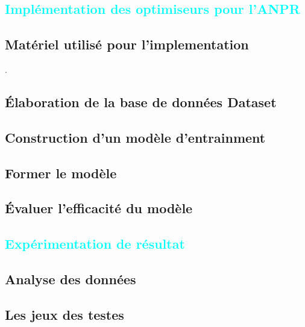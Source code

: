 
%
%

\textcolor{cyan}{\chapter{Implémentation des optimiseurs pour l'ANPR}}

	\section{Matériel utilisé pour l'implementation}
	\lipsum[1].
	\section{Élaboration de la base de données {Dataset}}
	
	\lipsum[1]
	
	\section{Construction d'un modèle d'entrainment}
	\section{Former le modèle}
	\lipsum[1]
	
	\section{Évaluer l'efficacité du modèle}
	
	\lipsum[1]
	
	
%
%

\textcolor{cyan}{\chapter{Expérimentation de résultat}}
	\section{Analyse des données } 
	\lipsum[1] 
	\section{Les jeux des testes}
	\lipsum[1] 
	
